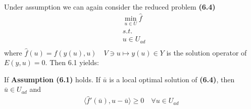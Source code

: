 Under assumption we can again consider the reduced problem \textbf{(6.4)}
\begin{align*}
	&\min_{u \in U} \hat{f} \\
	&s.t. \\
	&u \in U_{ad}\\
\end{align*}
where $\hat{f}(u) = f(y(u), u) \quad V \ni u \mapsto y(u) \in Y$ is the solution operator of $E(y, u) = 0$. Then 6.1 yields:

\begin{theorem}
	If \textbf{Assumption (6.1)} holds. If $\bar{u}$ is a local optimal solution of \textbf{(6.4)}, then $\bar{u} \in U_{ad}$ and 
	\begin{align*}
		\langle \hat{f}'(\bar{u}), u - \bar{u} \rangle \geq 0 \quad 
		\forall u \in U_{ad}
	\end{align*}
\end{theorem}

